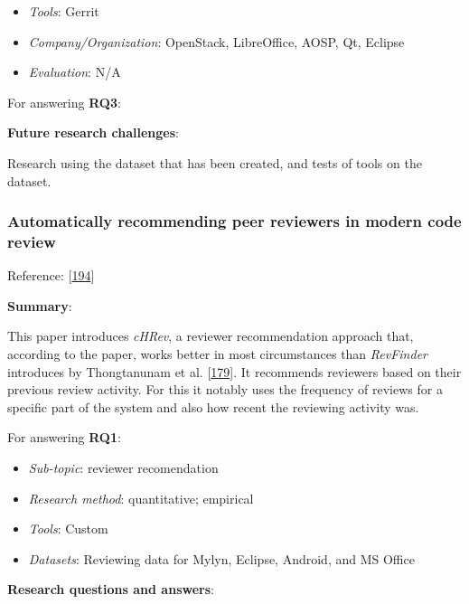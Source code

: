 \documentclass[]{book}
\providecommand{\tightlist}{%
  \setlength{\itemsep}{0pt}\setlength{\parskip}{0pt}}
\begin{document}
\begin{itemize}
\tightlist
\item
  \emph{Tools}: Gerrit
\item
  \emph{Company/Organization}: OpenStack, LibreOffice, AOSP, Qt, Eclipse
\item
  \emph{Evaluation}: N/A
\end{itemize}

For answering \textbf{RQ3}:

\textbf{Future research challenges}:

Research using the dataset that has been created, and tests of tools on
the dataset.

\subsubsection{Automatically recommending peer reviewers in modern code
review}\label{automatically-recommending-peer-reviewers-in-modern-code-review}

Reference: {[}\protect\hyperlink{ref-zanjani2016automatically}{194}{]}

\textbf{Summary}:

This paper introduces \emph{cHRev}, a reviewer recommendation approach
that, according to the paper, works better in most circumstances than
\emph{RevFinder} introduces by Thongtanunam et al.
{[}\protect\hyperlink{ref-thongtanunam2015should}{179}{]}. It recommends
reviewers based on their previous review activity. For this it notably
uses the frequency of reviews for a specific part of the system and also
how recent the reviewing activity was.

For answering \textbf{RQ1}:

\begin{itemize}
\tightlist
\item
  \emph{Sub-topic}: reviewer recomendation
\item
  \emph{Research method}: quantitative; empirical
\item
  \emph{Tools}: Custom
\item
  \emph{Datasets}: Reviewing data for Mylyn, Eclipse, Android, and MS
  Office
\end{itemize}

\textbf{Research questions and answers}:
\end{document}
